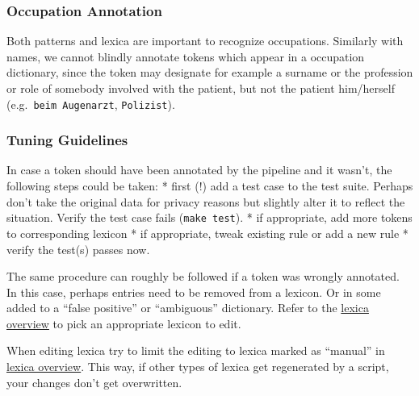 \subsubsection{Occupation Annotation}\label{occupation-annotation}

Both patterns and lexica are important to recognize occupations.
Similarly with names, we cannot blindly annotate tokens which appear in
a occupation dictionary, since the token may designate for example a
surname or the profession or role of somebody involved with the patient,
but not the patient him/herself (e.g.~\texttt{beim\ Augenarzt},
\texttt{Polizist}).

\subsubsection{Tuning Guidelines}\label{tuning-guidelines}

In case a token should have been annotated by the pipeline and it
wasn't, the following steps could be taken: * first (!) add a test case
to the test suite. Perhaps don't take the original data for privacy
reasons but slightly alter it to reflect the situation. Verify the test
case fails (\texttt{make\ test}). * if appropriate, add more tokens to
corresponding lexicon * if appropriate, tweak existing rule or add a new
rule * verify the test(s) passes now.

The same procedure can roughly be followed if a token was wrongly
annotated. In this case, perhaps entries need to be removed from a
lexicon. Or in some added to a ``false positive'' or ``ambiguous''
dictionary. Refer to the \href{lexica.md}{lexica overview} to pick an
appropriate lexicon to edit.

When editing lexica try to limit the editing to lexica marked as
``manual'' in \href{lexica.md}{lexica overview}. This way, if other
types of lexica get regenerated by a script, your changes don't get
overwritten.
